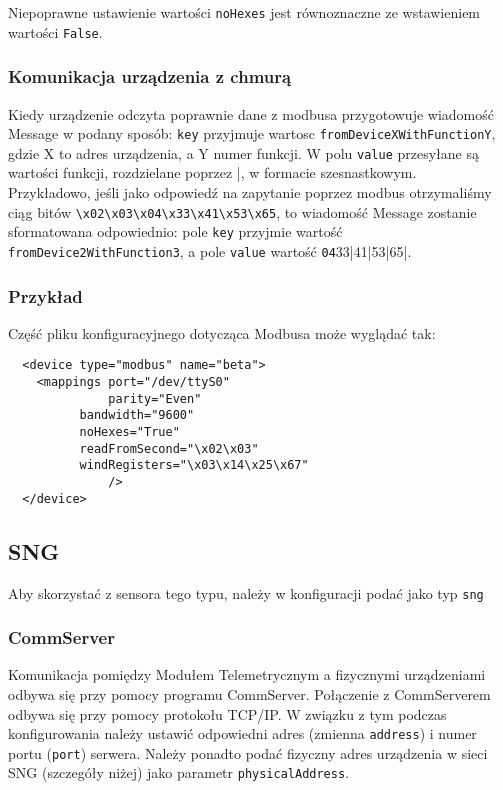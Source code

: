 \documentclass[11pt]{article}
\begin{document}
Niepoprawne ustawienie wartości \verb|noHexes| jest równoznaczne ze wstawieniem wartości \verb|False|.

\subsubsection{Komunikacja urządzenia z chmurą}
Kiedy urządzenie odczyta poprawnie dane z modbusa przygotowuje wiadomość Message w podany sposób: 
\verb|key| przyjmuje wartosc \verb|fromDeviceXWithFunctionY|, gdzie X to adres urządzenia, a Y numer funkcji.
W polu \verb|value| przesyłane są wartości funkcji, rozdzielane poprzez |, w formacie szesnastkowym. \\
Przykładowo, jeśli jako odpowiedź na zapytanie poprzez modbus otrzymaliśmy ciąg bitów \verb|\x02\x03\x04\x33\x41\x53\x65|, to
wiadomość Message zostanie sformatowana odpowiednio: pole \verb|key| przyjmie wartość \verb|fromDevice2WithFunction3|, a pole
\verb|value| wartość \verb|04|33|41|53|65|. 


\subsubsection{Przykład}
Część pliku konfiguracyjnego dotycząca Modbusa może wyglądać tak:
\begin{verbatim}
  <device type="modbus" name="beta">
    <mappings port="/dev/ttyS0"
              parity="Even"
	      bandwidth="9600"
	      noHexes="True"
	      readFromSecond="\x02\x03"
	      windRegisters="\x03\x14\x25\x67"
              />
  </device>
\end{verbatim}


\subsection{SNG}
Aby skorzystać z sensora tego typu, należy w konfiguracji podać jako typ \verb|sng|
\subsubsection{CommServer}
Komunikacja pomiędzy Modułem Telemetrycznym a fizycznymi urządzeniami odbywa się przy pomocy
programu CommServer. Połączenie z CommServerem odbywa się przy pomocy protokołu TCP/IP.
W związku z tym podczas konfigurowania należy ustawić odpowiedni adres (zmienna \verb|address|)
i numer portu (\verb|port|) serwera. Należy ponadto podać fizyczny adres urządzenia w sieci 
SNG (szczegóły niżej) jako parametr \verb|physicalAddress|.
\end{document}
